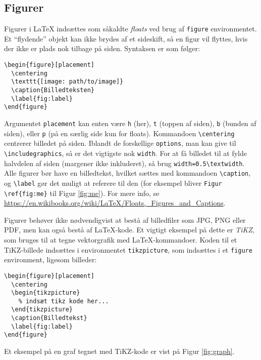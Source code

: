 \subsection{Figurer}
\label{sec:figures}

Figurer i \LaTeX{} indsættes som såkaldte \emph{floats} ved brug af \texttt{figure} environmentet.
Et ``flydende'' objekt kan ikke brydes af et sideskift, så en figur vil flyttes, hvis der ikke er plads nok tilbage på siden.
Syntaksen er som følger:
%
\begin{verbatim}
\begin{figure}[placement]
  \centering
  \texttt{[image: path/to/image]}
  \caption{Billedteksten}
  \label{fig:label}
\end{figure}
\end{verbatim}
%
Argumentet \texttt{placement} kan enten være \texttt{h} (her), \texttt{t} (toppen af siden), \texttt{b} (bunden af siden), eller \texttt{p} (på en særlig side kun for floats).
Kommandoen \verb!\centering! centrerer billedet på siden.
Iblandt de forskellige \texttt{options}, man kan give til \verb!\includegraphics!, så er det vigtigste nok \texttt{width}.
For at få billedet til at fylde halvdelen af siden (margener ikke inkluderet), så brug \verb!width=0.5\textwidth!.
Alle figurer bør have en billedtekst, hvilket sættes med kommandoen \verb!\caption!, og \verb!\label! gør det muligt at referere til den (for eksempel bliver \verb!Figur \ref{fig:me}! til Figur \ref{fig:me}).
For mere info, se \url{https://en.wikibooks.org/wiki/LaTeX/Floats,_Figures_and_Captions}.



Figurer behøver ikke nødvendigvist at bestå af billedfiler som JPG, PNG eller PDF, men kan også bestå af \LaTeX{}-kode.
Et vigtigt eksempel på dette er \emph{TiKZ}, som bruges til at tegne vektorgrafik med \LaTeX{}-kommandoer.
Koden til et TiKZ-billede indsættes i environmentet \texttt{tikzpicture}, som indsættes i et \texttt{figure} environment, ligesom billeder:
%
\begin{verbatim}
\begin{figure}[placement]
  \centering
  \begin{tikzpicture}
    % indsæt tikz kode her...
  \end{tikzpicture}
  \caption{Billedtekst}
  \label{fig:label}
\end{figure}
\end{verbatim}
%
Et eksempel på en graf tegnet med TiKZ-kode er vist på Figur \ref{fig:graph}.

